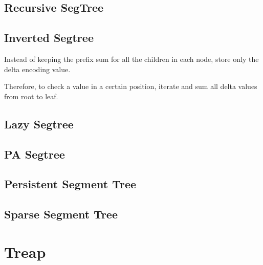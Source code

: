     \subsection{Recursive SegTree}



    \vspace{5pts}

    \subsection{Inverted Segtree}

        Instead of keeping the prefix sum for all the children in each node, store only the delta encoding value.

        Therefore, to check a value in a certain position, iterate and sum all delta values from root to leaf.


    \subsection{Lazy Segtree}


    \subsection{PA Segtree}


    \subsection{Persistent Segment Tree}


    \subsection{Sparse Segment Tree}

        
\section{Treap}

